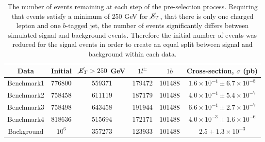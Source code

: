 \begin{table}[htbp]
    \centering
    \begin{tabular}{c|c|c|c|c||c} 
    \toprule
    Data & Initial & $\cancel{\it{E}}_{T}>250$ GeV & $1l^\pm$ & $1b$ & Cross-section, $\sigma$ (pb) \\
    \midrule
    \rowcolor{gray!6} Benchmark1 & 776800 & 559371 & 179472 & 101488 & $1.6\times10^{-4} \pm 6.7\times10^{-8}$ \\
    Benchmark2 & 758458 & 611119 & 187179 & 101488 & $4.0\times10^{-4} \pm  5.4\times10^{-7}$ \\
    \rowcolor{gray!6} Benchmark3 & 758498 & 643458 & 191944 & 101488 & $6.6\times10^{-4} \pm 2.7\times10^{-7}$ \\
    Benchmark4 & 818636 & 515694 & 172171 &101488  & $4.0\times10^{-3} \pm 1.6\times10^{-6}$ \\
    \rowcolor{gray!6} Background & $10^6$ & 357273 & 123933 & 101488 & $2.5 \pm 1.3\times10^{-3}$ \\
    \bottomrule
    \end{tabular}
    \caption{The number of events remaining at each step of the pre-selection process. Requiring that events satisfy a minimum of 250 GeV for $\cancel{\it{E}}_{T}$, that there is only one charged lepton and one $b$-tagged jet, the number of events significantly differs between simulated signal and background events. Therefore the initial number of events was reduced for the signal events in order to create an equal split between signal and background within each data.} 
    \label{tab:preselection}
\end{table}